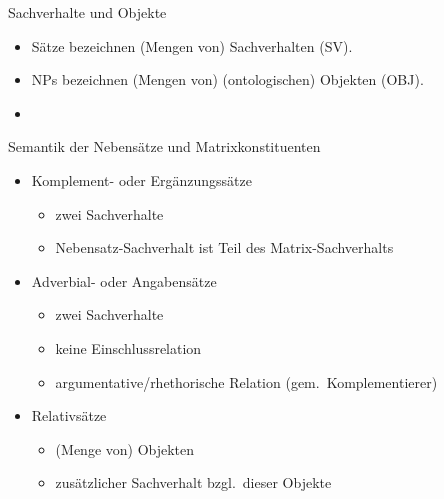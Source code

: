 \begin{frame}
  {Sachverhalte und Objekte}
  \pause
  \begin{exe}
    \pause
  \end{exe}
  \pause\Halbzeile
  \begin{itemize}[<+->]
    \item Sätze bezeichnen \alert{(Mengen von) Sachverhalten (SV)}.
    \item NPs bezeichnen \alert{(Mengen von) (ontologischen) Objekten (OBJ).}
      \Halbzeile
    \item {}
  \end{itemize}
\end{frame}


\begin{frame}
  {Semantik der Nebensätze und Matrixkonstituenten}
  \pause
  \begin{exe}
    \pause
    \pause
  \end{exe}
  \pause
  \Halbzeile
  \begin{itemize}[<+->]
    \item Komplement- oder Ergänzungssätze
      \begin{itemize}[<+->]
        \item zwei Sachverhalte
        \item Nebensatz-Sachverhalt ist \alert{Teil des Matrix-Sachverhalts}
      \end{itemize}
    \item Adverbial- oder Angabensätze
      \begin{itemize}[<+->]
        \item zwei Sachverhalte
        \item keine Einschlussrelation
        \item \alert{argumentative\slash rhethorische Relation} (gem.\ Komplementierer)
      \end{itemize}
    \item Relativsätze
      \begin{itemize}[<+->]
        \item (Menge von) Objekten
        \item \alert{zusätzlicher Sachverhalt bzgl.\ dieser Objekte}
      \end{itemize}
  \end{itemize}
\end{frame}

